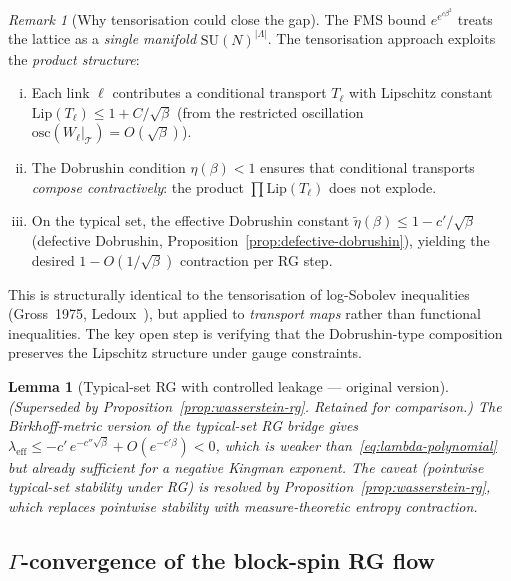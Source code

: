 \documentclass[12pt,a4paper]{article}
\theoremstyle{definition}
\theoremstyle{plain}
\newtheorem{lemma}[definition]{Lemma}
\theoremstyle{remark}
\newtheorem{remark}[definition]{Remark}
\begin{document}
\begin{remark}[Why tensorisation could close the gap]
\label{rem:tensorisation-mechanism}
The FMS bound $e^{e^{c\beta^2}}$ treats the lattice as a
\emph{single manifold} $\mathrm{SU}(N)^{|\Lambda|}$.
The tensorisation approach exploits the \emph{product structure}:
\begin{enumerate}[(i)]
\item Each link $\ell$ contributes a conditional transport $T_\ell$
  with Lipschitz constant $\mathrm{Lip}(T_\ell) \leq 1 + C/\sqrt{\beta}$
  (from the restricted oscillation $\mathrm{osc}(W_\ell|_{\mathcal{T}}) = O(\sqrt{\beta})$).
\item The Dobrushin condition $\eta(\beta) < 1$ ensures that
  conditional transports \emph{compose contractively}:
  the product $\prod \mathrm{Lip}(T_\ell)$ does not explode.
\item On the typical set, the effective Dobrushin constant
  $\tilde{\eta}(\beta) \leq 1 - c'/\sqrt{\beta}$ (defective Dobrushin,
  Proposition~\ref{prop:defective-dobrushin}),
  yielding the desired $1 - O(1/\sqrt{\beta})$ contraction per RG step.
\end{enumerate}
This is structurally identical to the tensorisation of log-Sobolev
inequalities (Gross~1975, Ledoux~\cite{Ledoux2001}), but applied to
\emph{transport maps} rather than functional inequalities.
The key open step is verifying that the Dobrushin-type composition
preserves the Lipschitz structure under gauge constraints.
\end{remark}

\begin{lemma}[Typical-set RG with controlled leakage --- original version]\label{lem:typical-rg-old}
\emph{(Superseded by Proposition~\ref{prop:wasserstein-rg}.
Retained for comparison.)}
The Birkhoff-metric version of the typical-set RG bridge
gives $\lambda_{\mathrm{eff}} \leq -c'\,e^{-c''\sqrt{\beta}} + O(e^{-c'\beta}) < 0$,
which is weaker than~\eqref{eq:lambda-polynomial} but already sufficient
for a negative Kingman exponent.
The caveat (pointwise typical-set stability under RG) is resolved by
Proposition~\ref{prop:wasserstein-rg}, which replaces pointwise stability
with measure-theoretic entropy contraction.
\end{lemma}

\subsection{\texorpdfstring{$\Gamma$}{Gamma}-convergence of the block-spin RG flow}\label{sec:gamma-rg}
\end{document}
